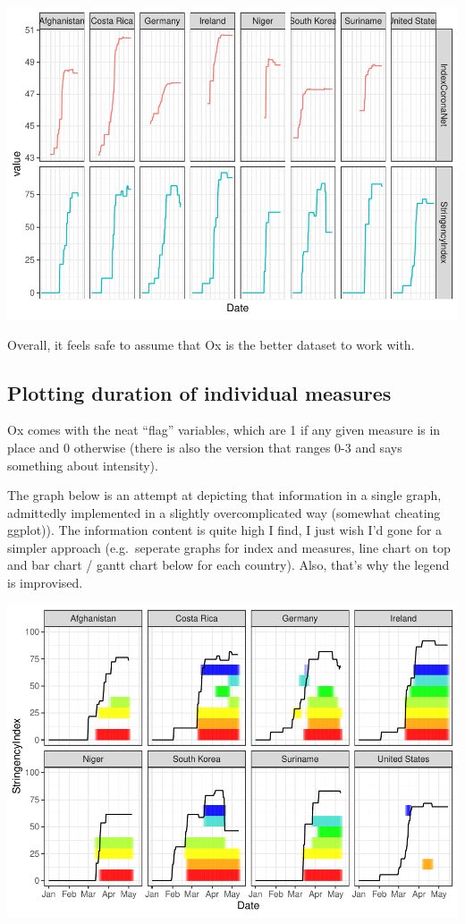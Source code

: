 \documentclass[
  english,
  ,doc,floatsintext]{apa6}
\begin{document}
\includegraphics{LR_explore_OK_comms_files/figure-latex/lines compare-1.pdf}

Overall, it feels safe to assume that Ox is the better dataset to work with.

\hypertarget{plotting-duration-of-individual-measures}{%
\subsection{Plotting duration of individual measures}\label{plotting-duration-of-individual-measures}}

Ox comes with the neat \enquote{flag} variables, which are 1 if any given measure is in place and 0 otherwise (there is also the version that ranges 0-3 and says something about intensity).

The graph below is an attempt at depicting that information in a single graph, admittedly implemented in a slightly overcomplicated way (somewhat cheating ggplot)). The information content is quite high I find, I just wish I'd gone for a simpler approach (e.g.~seperate graphs for index and measures, line chart on top and bar chart / gantt chart below for each country). Also, that's why the legend is improvised.

\includegraphics{LR_explore_OK_comms_files/figure-latex/measures-1.pdf}
\end{document}
